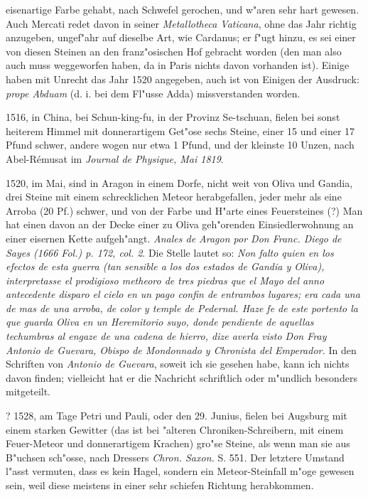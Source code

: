 \documentclass[a4paper, 11pt, oneside, polutonikogreek, german]{article}
\begin{document}
eisenartige Farbe gehabt, nach Schwefel gerochen, und w"aren sehr hart gewesen. Auch Mercati redet davon in seiner \emph{Metallotheca Vaticana}, ohne das Jahr richtig anzugeben, ungef"ahr auf dieselbe Art, wie Cardanus; er f"ugt hinzu, es sei einer von diesen Steinen an den franz"osischen Hof gebracht worden (den man also auch muss weggeworfen haben, da in Paris nichts davon vorhanden ist). Einige haben mit Unrecht das Jahr 1520 angegeben, auch ist von Einigen der Ausdruck: \emph{prope Abduam} (d. i. bei dem Fl"usse Adda) missverstanden worden.

1516, in China, bei Schun-king-fu, in der Provinz Se-tschuan, fielen bei sonst heiterem Himmel mit donnerartigem Get"ose sechs Steine, einer 15 und einer 17 Pfund schwer, andere wogen nur etwa 1 Pfund, und der kleinste 10 Unzen, nach Abel-Rémusat im \emph{Journal de Physique, Mai 1819}.

1520, im Mai, sind in Aragon in einem Dorfe, nicht weit von Oliva und Gandia, drei Steine mit einem schrecklichen Meteor herabgefallen, jeder mehr als eine Arroba (20 Pf.) schwer, und von der Farbe und H"arte eines Feuersteines (?) Man hat einen davon an der Decke einer zu Oliva geh"orenden Einsiedlerwohnung an einer eisernen Kette aufgeh"angt. \emph{Anales de Aragon por Don Franc. Diego de Sayes (1666 Fol.) p. 172, col. 2}. Die Stelle lautet so: \emph{Non falto quien en los efectos de esta guerra (tan sensible a los dos estados de Gandia y Oliva), interpretasse el prodigioso metheoro de tres piedras que el Mayo del anno antecedente disparo el cielo en un pago confin de entrambos lugares; era cada una de mas de una arroba, de color y temple de Pedernal. Haze fe de este portento la que guarda Oliva en un Heremitorio suyo, donde pendiente de aquellas techumbras al engaze de una cadena de hierro, dize averla visto Don Fray Antonio de Guevara, Obispo de Mondonnado y Chronista del Emperador.} In den Schriften von \emph{Antonio de Guevara}, soweit ich sie gesehen habe, kann ich nichts davon finden; vielleicht hat er die Nachricht schriftlich oder m"undlich besonders mitgeteilt.

? 1528, am Tage Petri und Pauli, oder den 29. Junius, fielen bei Augsburg mit einem starken Gewitter (das ist bei "alteren Chroniken-Schreibern, mit einem Feuer-Meteor und donnerartigem Krachen) gro"se Steine, als wenn man sie aus B"uchsen sch"osse, nach Dressers \emph{Chron. Saxon.} S. 551. Der letztere Umstand l"asst vermuten, dass es kein Hagel, sondern ein Meteor-Steinfall m"oge gewesen sein, weil diese meistens in einer sehr schiefen Richtung herabkommen.
\end{document}
